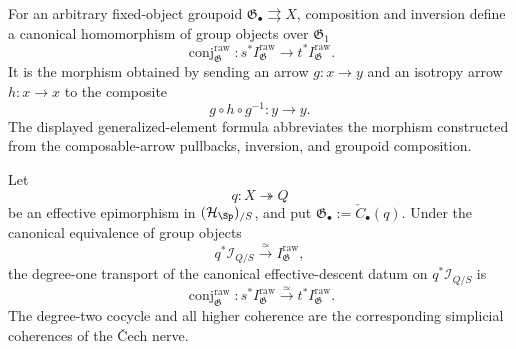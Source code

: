 \begin{definition}
\label{def:raw-conjugation}
For an arbitrary fixed-object groupoid
$\mathfrak G_\bullet\rightrightarrows X$, composition and inversion define a
canonical homomorphism of group objects over $\mathfrak G_1$
\[
    \operatorname{conj}^{\mathrm{raw}}_{\mathfrak G}:
    s^*I^{\mathrm{raw}}_{\mathfrak G}
    \longrightarrow
    t^*I^{\mathrm{raw}}_{\mathfrak G}.
\]
It is the morphism obtained by sending an arrow $g:x\to y$ and an isotropy
arrow $h:x\to x$ to the composite
\[
    g\circ h\circ g^{-1}:y\longrightarrow y.
\]
The displayed generalized-element formula abbreviates the morphism constructed
from the composable-arrow pullbacks, inversion, and groupoid composition.
\end{definition}

\begin{theorem}
\label{thm:inertia-descent-conjugation}
Let
\[
    q:X\twoheadrightarrow Q
\]
be an effective epimorphism in $(\mathcal H_{\Sp})_{/S}$, and put
$\mathfrak G_\bullet:=\check C_\bullet(q)$.  Under the canonical equivalence
of group objects
\[
    q^*\mathcal I_{Q/S}
    \xrightarrow{\simeq}
    I^{\mathrm{raw}}_{\mathfrak G},
\]
the degree-one transport of the canonical effective-descent datum on
$q^*\mathcal I_{Q/S}$ is
\[
    \operatorname{conj}^{\mathrm{raw}}_{\mathfrak G}:
    s^*I^{\mathrm{raw}}_{\mathfrak G}
    \xrightarrow{\simeq}
    t^*I^{\mathrm{raw}}_{\mathfrak G}.
\]
The degree-two cocycle and all higher coherence are the corresponding
simplicial coherences of the \v{C}ech nerve.
\end{theorem}


